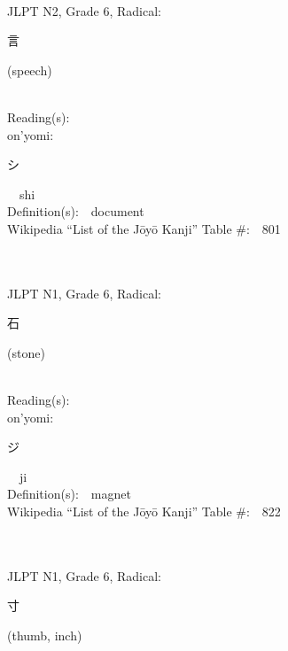 \begin{multicols}{2}
{\fontsize{34pt}{40pt}  }\ \ \\  %
{JLPT N2, Grade 6, Radical:\ \ {\begin{CJK}{UTF8}{min} 言 \end{CJK}} (speech) } \\
Reading(s):\ \ \\
{\hspace*{1em}}on'yomi:\ \ \\
{\hspace*{2em}}{\begin{CJK}{UTF8}{min} シ \end{CJK}}\ \ shi\ \ \\
Definition(s):\ \ document \\
Wikipedia ``List of the J\=oy\=o Kanji'' Table \#:\ \ 801 \\
\ \ \\
{\fontsize{34pt}{40pt}  }\ \ \\  %
{JLPT N1, Grade 6, Radical:\ \ {\begin{CJK}{UTF8}{min} 石 \end{CJK}} (stone) } \\
Reading(s):\ \ \\
{\hspace*{1em}}on'yomi:\ \ \\
{\hspace*{2em}}{\begin{CJK}{UTF8}{min} ジ \end{CJK}}\ \ ji\ \ \\
Definition(s):\ \ magnet \\
Wikipedia ``List of the J\=oy\=o Kanji'' Table \#:\ \ 822 \\
\ \ \\
{\fontsize{34pt}{40pt}  }\ \ \\  %
{JLPT N1, Grade 6, Radical:\ \ {\begin{CJK}{UTF8}{min} 寸 \end{CJK}} (thumb, inch) } \\

\end{multicols}
